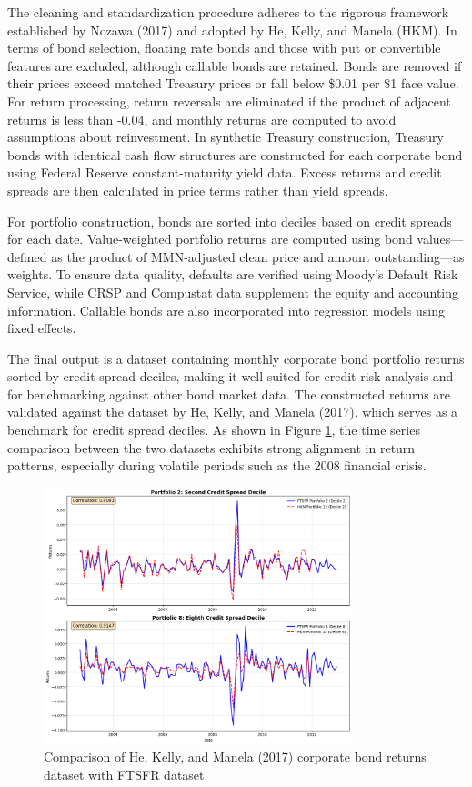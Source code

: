 \documentclass{article}
\begin{document}
\begin{appendices}
The cleaning and standardization procedure adheres to the rigorous framework established by Nozawa (2017) and adopted by He, Kelly, and Manela (HKM). In terms of bond selection, floating rate bonds and those with put or convertible features are excluded, although callable bonds are retained. Bonds are removed if their prices exceed matched Treasury prices or fall below \$0.01 per \$1 face value. For return processing, return reversals are eliminated if the product of adjacent returns is less than -0.04, and monthly returns are computed to avoid assumptions about reinvestment. In synthetic Treasury construction, Treasury bonds with identical cash flow structures are constructed for each corporate bond using Federal Reserve constant-maturity yield data. Excess returns and credit spreads are then calculated in price terms rather than yield spreads.

For portfolio construction, bonds are sorted into deciles based on credit spreads for each date. Value-weighted portfolio returns are computed using bond values—defined as the product of MMN-adjusted clean price and amount outstanding—as weights. To ensure data quality, defaults are verified using Moody's Default Risk Service, while CRSP and Compustat data supplement the equity and accounting information. Callable bonds are also incorporated into regression models using fixed effects.

The final output is a dataset containing monthly corporate bond portfolio returns sorted by credit spread deciles, making it well-suited for credit risk analysis and for benchmarking against other bond market data. The constructed returns are validated against the dataset by He, Kelly, and Manela (2017), which serves as a benchmark for credit spread deciles. As shown in Figure \ref{fig:corp_bond_returns_comparison}, the time series comparison between the two datasets exhibits strong alignment in return patterns, especially during volatile periods such as the 2008 financial crisis.

\begin{figure}[h!]
    \centering
    \includegraphics[width=0.8\textwidth]{../docs_src/corporate_returns_compare.png}
    \caption{Comparison of He, Kelly, and Manela (2017) corporate bond returns dataset with FTSFR dataset}
    \label{fig:corp_bond_returns_comparison}
  \end{figure}


\end{appendices}
\end{document}
